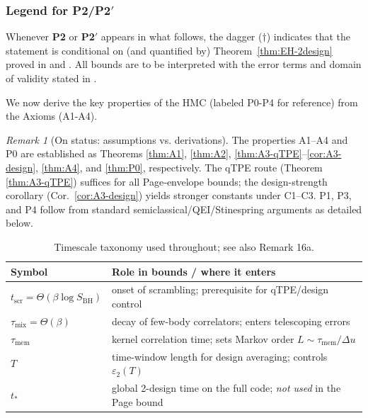 \documentclass[aps,prd,preprint,onecolumn,superscriptaddress,nofootinbib,longbibliography,floatfix,11pt,showpacs,showkeys]{revtex4-2}
\newcommand{\Ptwo}{\textbf{P2}\xspace}
\newcommand{\PtwoPrime}{\textbf{P2$'$}\xspace}
\newcommand{\HMC}{\textsc{HMC}\xspace}
\theoremstyle{plain}
\theoremstyle{definition}
\theoremstyle{remark}
\newtheorem{remark}[theorem]{Remark}
\begin{document}
\subsubsection{Legend for \Ptwo/\PtwoPrime}
Whenever \Ptwo or \PtwoPrime appears in what follows, the dagger ($\dagger$) indicates that the statement is conditional on (and quantified by) Theorem~\ref{thm:EH-2design} proved in  and .
All bounds are to be interpreted with the error terms and domain of validity stated in .

\label{sec:derivations_postulates}

\noindent
We now derive the key properties of the \HMC{} (labeled P0-P4 for reference) from the Axioms (A1-A4).


\begin{remark}[On status: assumptions vs. derivations]
\label{rem:status-derivations}
The properties A1–A4 and P0 are established as Theorems \ref{thm:A1}, \ref{thm:A2}, \ref{thm:A3-qTPE}–\ref{cor:A3-design}, \ref{thm:A4}, and \ref{thm:P0}, respectively. The qTPE route (Theorem \ref{thm:A3-qTPE}) suffices for all Page‑envelope bounds; the design-strength corollary (Cor.~\ref{cor:A3-design}) yields stronger constants under C1–C3. P1, P3, and P4 follow from standard semiclassical/QEI/Stinespring arguments as detailed below.
\end{remark}

% 
\begin{table}[t]
\centering
\begin{tabular}{ll}
\textbf{Symbol} & \textbf{Role in bounds / where it enters} \\\hline
$t_{\mathrm{scr}}\!=\!\Theta(\beta\log S_{\mathrm{BH}})$ & onset of scrambling; prerequisite for qTPE/design control \\
$\tau_{\mathrm{mix}}\!=\!\Theta(\beta)$ & decay of few-body correlators; enters telescoping errors \\
$\tau_{\mathrm{mem}}$ & kernel correlation time; sets Markov order $L\!\sim\!\tau_{\mathrm{mem}}/\Delta u$ \\
$T$ & time-window length for design averaging; controls $\varepsilon_2(T)$ \\
$t_\ast$ & global 2-design time on the full code; \emph{not used} in the Page bound \\
\end{tabular}
\caption{Timescale taxonomy used throughout; see also Remark 16a.}
\label{tab:timescales}
\end{table}
\end{document}

